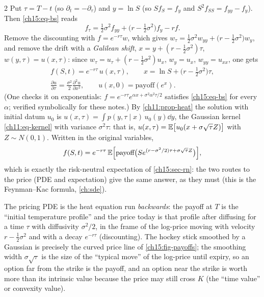 \begin{paracol}{2}
Put $\tau=T-t$ (so $\partial_t=-\partial_\tau$) and $y=\ln S$ (so $Sf_S=f_y$ and $S^2f_{SS}=f_{yy}-f_y$). Then \eqref{ch15:eq-bs} reads
\[
  f_\tau=\tfrac12\sigma^2f_{yy}+\bigl(r-\tfrac12\sigma^2\bigr)f_y-rf .
\]
Remove the discounting with $f=e^{-r\tau}w$, which gives $w_\tau=\tfrac12\sigma^2w_{yy}+\bigl(r-\tfrac12\sigma^2\bigr)w_y$, and remove the drift with a
\emph{Galilean shift}, $x=y+(r-\tfrac12\sigma^2)\tau$, $w(y,\tau)=u(x,\tau)$: since $w_\tau=u_\tau+(r-\tfrac12\sigma^2)u_x$, $w_y=u_x$, $w_{yy}=u_{xx}$, one gets
\begin{equation}\label{ch15:eq-heat}
\begin{gathered}
  f(S,t)=e^{-r\tau}\,u(x,\tau),\qquad x=\ln S+\bigl(r-\tfrac12\sigma^2\bigr)\tau,\\
  \frac{\partial u}{\partial\tau}=\frac{\sigma^2}2\frac{\partial^2u}{\partial x^2},\qquad u(x,0)=\text{payoff}(e^x).
\end{gathered}
\end{equation}
(One checks it on exponentials: $f=e^{-r\tau}e^{\alpha x+\sigma^2\alpha^2\tau/2}$ satisfies \eqref{ch15:eq-bs} for every $\alpha$; verified symbolically for these notes.)
By \cref{ch11:prop-heat} the solution with initial datum $u_0$ is $u(x,\tau)=\int p(y,\tau\mid x)\,u_0(y)\dd y$, the Gaussian kernel \eqref{ch11:eq-kernel}
with variance $\sigma^2\tau$: that is, $u(x,\tau)=\mathbb{E}\bigl[u_0(x+\sigma\sqrt\tau Z)\bigr]$ with $Z\sim N(0,1)$. Written in the original variables,
\begin{equation}\label{ch15:eq-pde-solution}
  f(S,t)=e^{-r\tau}\,\mathbb{E}\Bigl[\text{payoff}\bigl(Se^{(r-\sigma^2/2)\tau+\sigma\sqrt\tau Z}\bigr)\Bigr],
\end{equation}
which is exactly the risk-neutral expectation of \cref{ch15:sec-rn}: the two routes to the price (PDE and expectation) give the same answer, as they must (this is the
Feynman--Kac formula, \cref{ch:sde}).

\begin{intuition}
The pricing PDE is the heat equation run \emph{backwards}: the payoff at $T$ is the ``initial temperature profile'' and the price today is that profile after
diffusing for a time $\tau$ with diffusivity $\sigma^2/2$, in the frame of the log-price moving with velocity $r-\tfrac12\sigma^2$ and with a decay $e^{-r\tau}$ (discounting).
The hockey stick smoothed by a Gaussian is precisely the curved price line of \cref{ch15:fig-payoffs}; the smoothing width
$\sigma\sqrt\tau$ is the size of the ``typical move'' of the log-price until expiry, so an option far from the strike is the payoff, and an option near
the strike is worth more than its intrinsic value because the price may still cross $K$ (the ``time value'' or convexity value).
\end{intuition}


\end{paracol}
